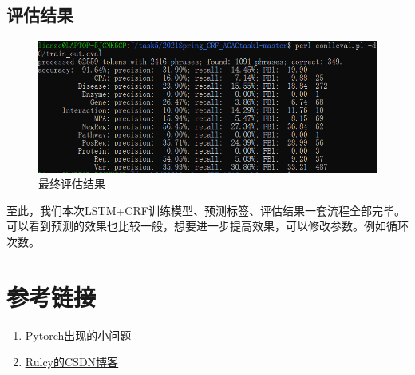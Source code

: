 \documentclass[12pt]{article}
\begin{document}
\subsection{评估结果}
\begin{figure}[H]
  \centering
  \includegraphics[scale=0.7]{./picture/result.png} %
  \caption{最终评估结果} %
  \label{zzaa} %
\end{figure}
至此，我们本次LSTM+CRF训练模型、预测标签、评估结果一套流程全部完毕。可以看到预测的效果也比较一般，想要进一步提高效果，可以修改参数。例如循环次数。

\section{参考链接}
\begin{enumerate}
\item \href{http://www.qishunwang.net/news_show_69347.aspx}{\underline{Pytorch出现的小问题}}
\item \href{https://blog.csdn.net/weixin_44371912/article/details/109682671}{\underline{Rulcy的CSDN博客}}
\end{enumerate}
\end{document}
